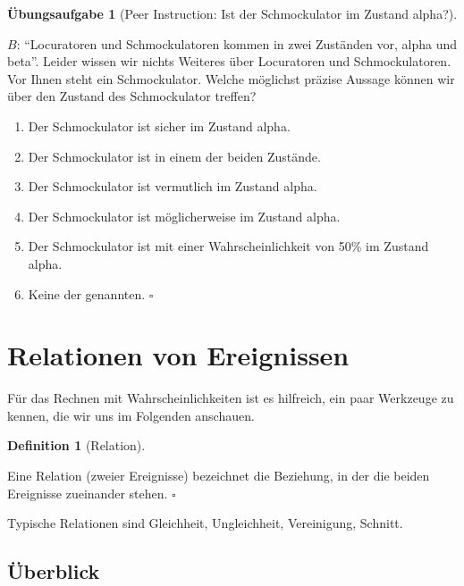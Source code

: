 \documentclass[
  ngerman,
  letterpaper,
  twoside,
  open=any]{scrbook}
\providecommand{\tightlist}{%
  \setlength{\itemsep}{0pt}\setlength{\parskip}{0pt}}\usepackage{longtable,booktabs,array}
\theoremstyle{definition}
\theoremstyle{plain}
\theoremstyle{definition}
\newtheorem{exercise}{Übungsaufgabe}[chapter]
\theoremstyle{definition}
\newtheorem{definition}{Definition}[chapter]
\theoremstyle{remark}
\begin{document}
\begin{exercise}[Peer Instruction: Ist der Schmockulator im Zustand
alpha?]\protect\hypertarget{exr-prob2}{}\label{exr-prob2}

\(B\): \enquote{Locuratoren und Schmockulatoren kommen in zwei Zuständen
vor, alpha und beta}. Leider wissen wir nichts Weiteres über Locuratoren
und Schmockulatoren. Vor Ihnen steht ein Schmockulator. Welche möglichst
präzise Aussage können wir über den Zustand des Schmockulator treffen?

\begin{enumerate}
\def\labelenumi{\Alph{enumi})}
\tightlist
\item
  Der Schmockulator ist sicher im Zustand alpha.
\item
  Der Schmockulator ist in einem der beiden Zustände.
\item
  Der Schmockulator ist vermutlich im Zustand alpha.
\item
  Der Schmockulator ist möglicherweise im Zustand alpha.
\item
  Der Schmockulator ist mit einer Wahrscheinlichkeit von 50\% im Zustand
  alpha.
\item
  Keine der genannten. \(\square\)
\end{enumerate}

\end{exercise}

\section{Relationen von Ereignissen}\label{relationen-von-ereignissen}

Für das Rechnen mit Wahrscheinlichkeiten ist es hilfreich, ein paar
Werkzeuge zu kennen, die wir uns im Folgenden anschauen.

\begin{definition}[Relation]\protect\hypertarget{def-relation}{}\label{def-relation}

Eine Relation (zweier Ereignisse) bezeichnet die Beziehung, in der die
beiden Ereignisse zueinander stehen. \(\square\)

\end{definition}

Typische Relationen sind Gleichheit, Ungleichheit, Vereinigung, Schnitt.

\subsection{Überblick}\label{uxfcberblick}
\end{document}
